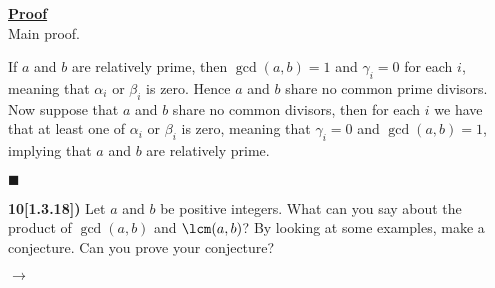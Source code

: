 \documentclass[12pt,a4paper]{article}
\newcommand{\prob}[2]{\textbf{#1)} #2}
\newenvironment{proof}
{
\textbf{\underline{Proof}} \\
}
{
\begin{flushright}
$\blacksquare$
\end{flushright}}
\begin{document}
\begin{proof}
Main proof.

If $a$ and $b$ are relatively prime, then $\gcd(a,b) = 1$ and $\gamma_i = 0$ for each $i$, meaning that $\alpha_i$ or $\beta_i$ is zero. Hence $a$ and $b$ share no common prime divisors. Now suppose that $a$ and $b$ share no common divisors, then for each $i$ we have that at least one of $\alpha_i$ or $\beta_i$ is zero, meaning that $\gamma_i = 0$ and $\gcd(a,b) = 1$, implying that $a$ and $b$ are relatively prime.
\end{proof}

\prob{10[1.3.18]}{Let $a$ and $b$ be positive integers. What can you say about the product of $\gcd(a,b)$ and $\lcm(a,b)$? By looking at some examples, make a conjecture. Can you prove your conjecture?}

$\rightarrow$ 
\end{document}
